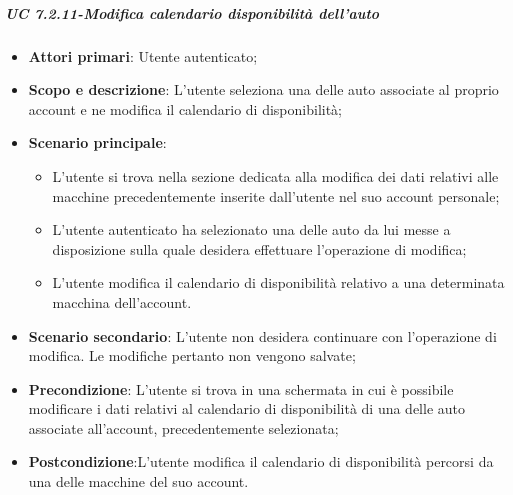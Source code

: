         \subparagraph{UC 7.2.11-Modifica calendario disponibilità dell'auto}
            \begin{itemize}
                \item \textbf{Attori primari}: Utente autenticato;
               
                \item \textbf{Scopo e descrizione}: L'utente seleziona una delle auto associate al proprio account e ne modifica il calendario di disponibilità; 
                \item \textbf{Scenario principale}:
                    \begin{itemize}
                        \item L'utente si trova nella sezione dedicata alla modifica dei dati relativi alle macchine precedentemente inserite dall'utente nel suo account personale;
                        \item L'utente autenticato ha selezionato una delle auto da lui messe a disposizione sulla quale desidera effettuare l'operazione di modifica;
                        \item L'utente modifica il calendario di disponibilità relativo a una determinata macchina dell'account.
                    \end{itemize}
                \item \textbf{Scenario secondario}: L'utente non desidera continuare con l'operazione di modifica. Le modifiche pertanto non vengono salvate;

                \item \textbf{Precondizione}: L'utente si trova in una schermata in cui è possibile modificare i dati relativi al calendario di disponibilità  di una delle auto associate all'account, precedentemente selezionata;
                \item \textbf{Postcondizione}:L'utente modifica il calendario di disponibilità percorsi da una delle macchine del suo account.
            \end{itemize}
            
